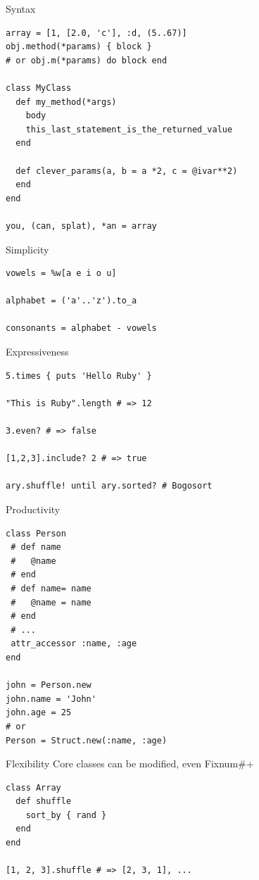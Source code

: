 \documentclass[10pt]{beamer}
\begin{document}
\begin{frame}[fragile]{Syntax}
\begin{lstlisting}
array = [1, [2.0, 'c'], :d, (5..67)]
obj.method(*params) { block }
# or obj.m(*params) do block end

class MyClass
  def my_method(*args)
    body
    this_last_statement_is_the_returned_value
  end

  def clever_params(a, b = a *2, c = @ivar**2)
  end
end

you, (can, splat), *an = array
\end{lstlisting}
\end{frame}

\begin{frame}[fragile]{Simplicity}
\begin{lstlisting}[xleftmargin=40pt]
vowels = %w[a e i o u]

alphabet = ('a'..'z').to_a

consonants = alphabet - vowels
\end{lstlisting}
\end{frame}

\begin{frame}[fragile]{Expressiveness}
\begin{lstlisting}[xleftmargin=30pt]
5.times { puts 'Hello Ruby' }

"This is Ruby".length # => 12

3.even? # => false

[1,2,3].include? 2 # => true

ary.shuffle! until ary.sorted? # Bogosort
\end{lstlisting}
\end{frame}

\begin{frame}[fragile]{Productivity}
\begin{lstlisting}
class Person
 # def name
 #   @name
 # end
 # def name= name
 #   @name = name
 # end
 # ...
 attr_accessor :name, :age
end

john = Person.new
john.name = 'John'
john.age = 25
# or
Person = Struct.new(:name, :age)
\end{lstlisting}
\end{frame}

\begin{frame}[fragile]{Flexibility}
Core classes can be modified, even Fixnum\#+
\begin{lstlisting}[xleftmargin=40pt]
class Array
  def shuffle
    sort_by { rand }
  end
end

[1, 2, 3].shuffle # => [2, 3, 1], ...
\end{lstlisting}
\end{frame}
\end{document}
